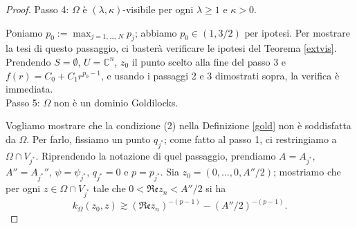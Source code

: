 \begin{proof}
    Passo 4: $\Omega$ è $(\lambda,\kappa)$-visibile per ogni $\lambda\ge 1$ e $\kappa>0$.

    Poniamo $p_0:=\displaystyle\max_{j=1,\dots,N} p_j$; abbiamo $p_0\in(1,3/2)$ per ipotesi. Per mostrare la tesi di questo passaggio, ci basterà verificare le ipotesi del Teorema \ref{extvis}. Prendendo $S=\emptyset$, $U=\mathbb{C}^n$, $z_0$ il punto scelto alla fine del passo 3 e $f(r)=C_0+C_1r^{p_0-1}$, e usando i passaggi 2 e 3 dimostrati sopra, la verifica è immediata.\\

    Passo 5: $\Omega$ non è un dominio Goldilocks.

    Vogliamo mostrare che la condizione (2) nella Definizione \ref{gold} non è soddisfatta da $\Omega$. Per farlo, fissiamo un punto $q_{j^*}$; come fatto al passo 1, ci restringiamo a $\Omega\cap V_{j^*}$. Riprendendo la notazione di quel passaggio, prendiamo $A=A_{j^*}$, $A''=A_{j^*}''$, $\psi=\psi_{j^*}$, $q_{j^*}=0$ e $p=p_{j^*}$. Sia $z_0=(0,\dots,0,A''/2)$; mostriamo che per ogni $z\in\Omega\cap V_{j^*}$ tale che $0<\mathfrak{Re}z_n<A''/2$ si ha
    \begin{equation}\label{7punto14}
        k_\Omega(z_0,z)\gtrsim(\mathfrak{Re}z_n)^{-(p-1)}-(A''/2)^{-(p-1)}.
    \end{equation}


\end{proof}
